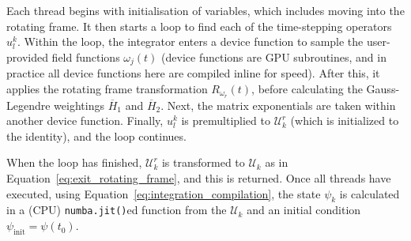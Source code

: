 \documentclass{jors}
\begin{document}
		Each thread begins with initialisation of variables, which includes moving into the rotating frame.
		It then starts a loop to find each of the time-stepping operators $ u^k_l $.
		Within the loop, the integrator enters a device function to sample the user-provided field functions $ \omega_j(t) $ (device functions are GPU subroutines, and in practice all device functions here are compiled inline for speed).
		After this, it applies the rotating frame transformation $R_{\omega_r}(t)$, before calculating the Gauss-Legendre weightings $ \overline{H}_1 $ and $ \overline{H}_2 $. Next, the matrix exponentials are taken within another device function.
		Finally, $ u^k_l $ is premultiplied to $ \mathcal{U}^r_k $ (which is initialized to the identity), and the loop continues.
		
		When the loop has finished, $ \mathcal{U}^r_k $ is transformed to $ \mathcal{U}_k $ as in Equation~\eqref{eq:exit_rotating_frame}, and this is returned.
		Once all threads have executed, using Equation~\eqref{eq:integration_compilation}, the state $ \psi_k $ is calculated in a (CPU) \texttt{numba.jit()}ed function from the $ \mathcal{U}_k $ and an initial condition $ \psi_{\mathrm{init}} = \psi(t_0) $.
\end{document}

